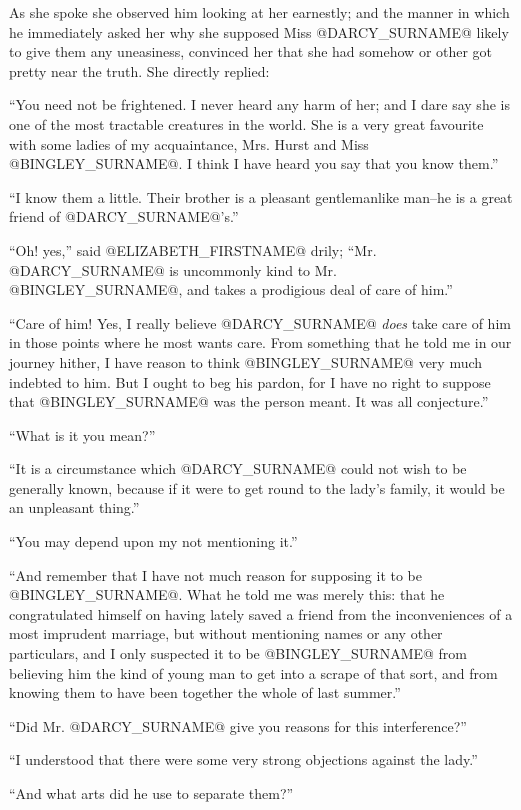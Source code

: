 As she spoke she observed him looking at her earnestly; and the manner
in which he immediately asked her why she supposed Miss @DARCY_SURNAME@ likely to
give them any uneasiness, convinced her that she had somehow or other
got pretty near the truth. She directly replied:

``You need not be frightened. I never heard any harm of her; and I dare
say she is one of the most tractable creatures in the world. She is a
very great favourite with some ladies of my acquaintance, Mrs. Hurst and
Miss @BINGLEY_SURNAME@. I think I have heard you say that you know them.''

``I know them a little. Their brother is a pleasant gentlemanlike man--he
is a great friend of @DARCY_SURNAME@'s.''

``Oh! yes,'' said @ELIZABETH_FIRSTNAME@ drily; ``Mr. @DARCY_SURNAME@ is uncommonly kind to Mr.
@BINGLEY_SURNAME@, and takes a prodigious deal of care of him.''

``Care of him! Yes, I really believe @DARCY_SURNAME@ \textit{does} take care of him in
those points where he most wants care. From something that he told me in
our journey hither, I have reason to think @BINGLEY_SURNAME@ very much indebted to
him. But I ought to beg his pardon, for I have no right to suppose that
@BINGLEY_SURNAME@ was the person meant. It was all conjecture.''

``What is it you mean?''

``It is a circumstance which @DARCY_SURNAME@ could not wish to be generally known,
because if it were to get round to the lady's family, it would be an
unpleasant thing.''

``You may depend upon my not mentioning it.''

``And remember that I have not much reason for supposing it to be
@BINGLEY_SURNAME@. What he told me was merely this: that he congratulated himself
on having lately saved a friend from the inconveniences of a most
imprudent marriage, but without mentioning names or any other
particulars, and I only suspected it to be @BINGLEY_SURNAME@ from believing
him the kind of young man to get into a scrape of that sort, and from
knowing them to have been together the whole of last summer.''

``Did Mr. @DARCY_SURNAME@ give you reasons for this interference?''

``I understood that there were some very strong objections against the
lady.''

``And what arts did he use to separate them?''

